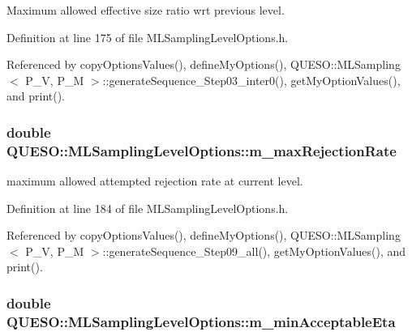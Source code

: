 Maximum allowed effective size ratio wrt previous level. 



Definition at line 175 of file M\-L\-Sampling\-Level\-Options.\-h.



Referenced by copy\-Options\-Values(), define\-My\-Options(), Q\-U\-E\-S\-O\-::\-M\-L\-Sampling$<$ P\-\_\-\-V, P\-\_\-\-M $>$\-::generate\-Sequence\-\_\-\-Step03\-\_\-inter0(), get\-My\-Option\-Values(), and print().

\hypertarget{class_q_u_e_s_o_1_1_m_l_sampling_level_options_ad7ec8ef589c49609d0082d3eb514bb13}{
\subsubsection[{m\-\_\-max\-Rejection\-Rate}]{\setlength{\rightskip}{0pt plus 5cm}double Q\-U\-E\-S\-O\-::\-M\-L\-Sampling\-Level\-Options\-::m\-\_\-max\-Rejection\-Rate}}\label{class_q_u_e_s_o_1_1_m_l_sampling_level_options_ad7ec8ef589c49609d0082d3eb514bb13}


maximum allowed attempted rejection rate at current level. 



Definition at line 184 of file M\-L\-Sampling\-Level\-Options.\-h.



Referenced by copy\-Options\-Values(), define\-My\-Options(), Q\-U\-E\-S\-O\-::\-M\-L\-Sampling$<$ P\-\_\-\-V, P\-\_\-\-M $>$\-::generate\-Sequence\-\_\-\-Step09\-\_\-all(), get\-My\-Option\-Values(), and print().

\hypertarget{class_q_u_e_s_o_1_1_m_l_sampling_level_options_a8230c7dd67833668237d3dc5b19c53c5}{
\subsubsection[{m\-\_\-min\-Acceptable\-Eta}]{\setlength{\rightskip}{0pt plus 5cm}double Q\-U\-E\-S\-O\-::\-M\-L\-Sampling\-Level\-Options\-::m\-\_\-min\-Acceptable\-Eta}}\label{class_q_u_e_s_o_1_1_m_l_sampling_level_options_a8230c7dd67833668237d3dc5b19c53c5}


